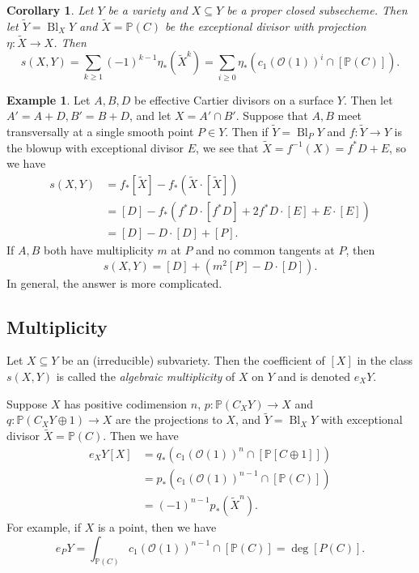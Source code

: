 \documentclass[leqno, openany]{memoir}
\newtheorem{cor}[thm]{Corollary}
\theoremstyle{definition}
\newtheorem{exm}[thm]{Example}
\theoremstyle{remark}
\theoremstyle{plain}
\theoremstyle{definition}
\theoremstyle{remark}
\renewcommand{\P}{\mathbb{P}}
\newcommand{\msc}[1]{\mathscr{#1}}
\newcommand{\wt}[1]{\widetilde{#1}}
\DeclareMathOperator{\Bl}{Bl}
\begin{document}
\begin{cor}
    Let $Y$ be a variety and $X \subseteq Y$ be a proper closed subsecheme. Then let $\wt{Y} = \operatorname{Bl}_X Y$ and $\wt{X} = \P(C)$ be the exceptional divisor with projection $\eta \colon \wt{X} \to X$. Then
    \[ s(X,Y) = \sum_{k \geq 1} {(-1)}^{k-1} \eta_* (\wt{X}^k) = \sum_{i \geq 0} \eta_* ({c_1(\msc{O}(1))}^i \cap [\P(C)]). \]
\end{cor}

\begin{exm}
    Let $A, B, D$ be effective Cartier divisors on a surface $Y$. Then let $A' = A + D, B' = B + D$, and let $X = A' \cap B'$. Suppose that $A, B$ meet transversally at a single smooth point $P \in Y$. Then if $\wt{Y} = \Bl_P Y$ and $f \colon \wt{Y} \to Y$ is the blowup with exceptional divisor $E$, we see that $\wt{X} = f^{-1}(X) = f^* D + E$, so we have
    \begin{align*}
        s(X,Y) &= f_* [\wt{X}] - f_* (\wt{X} \cdot [\wt{X}]) \\
               &= [D] - f_* (f^* D \cdot [f^* D] + 2 f^* D \cdot [E] + E \cdot [E]) \\
               &= [D] - D \cdot [D] + [P]. 
    \end{align*}
    If $A,B$ both have multiplicity $m$ at $P$ and no common tangents at $P$, then
    \[ s(X,Y) = [D] + (m^2[P] - D \cdot [D]). \]
    In general, the answer is more complicated.
\end{exm}

\subsection{Multiplicity}%
\label{sub:multiplicity}

Let $X \subseteq Y$ be an (irreducible) subvariety. Then the coefficient of $[X]$ in the class $s(X,Y)$ is called the \textit{algebraic multiplicity} of $X$ on $Y$ and is denoted $e_X Y$. 

Suppose $X$ has positive codimension $n$, $p \colon \P(C_X Y) \to X$ and $q \colon \P(C_X Y \oplus 1) \to X$ are the projections to $X$, and $\wt{Y} = \operatorname{Bl}_X Y$ with exceptional divisor $\wt{X} = \P(C)$. Then we have
\begin{align*}
    e_X Y [X] &= q_* ( {c_1 ( \msc{O}(1) )}^n \cap [\P[C \oplus 1]] ) \\
              &= p_* ({c_1 (\msc{O}(1))}^{n-1} \cap [\P(C)]) \\
              &= {(-1)}^{n-1} p_* (\wt{X}^n). 
\end{align*}
For example, if $X$ is a point, then we have
\[ e_P Y = \int_{\P(C)} {c_1(\msc{O}(1))}^{n-1} \cap [\P(C)] = \deg [P(C)]. \]
\end{document}
